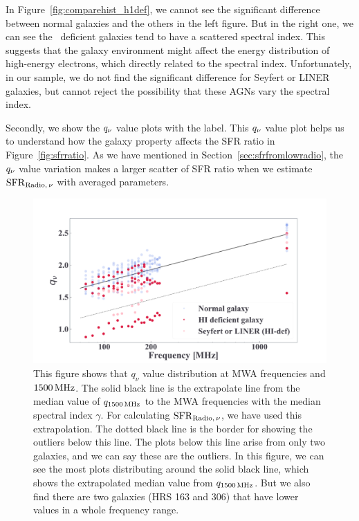 In Figure~\ref{fig:comparehist_h1def}, we cannot see the significant difference between normal galaxies and the others in the left figure.
But in the right one, we can see the \nh~deficient galaxies tend to have a scattered spectral index.
This suggests that the galaxy environment might affect the energy distribution of high-energy electrons, which directly related to the spectral index.
Unfortunately, in our sample, we do not find the significant difference for Seyfert or LINER galaxies, but cannot reject the possibility that these AGNs vary the spectral index.

Secondly, we show the $\qn$ value plots with the label.
This $\qn$ value plot helps us to understand how the galaxy property affects the SFR ratio in Figure~\ref{fig:sfrratio}.
As we have mentioned in Section~\ref{sec:sfrfromlowradio}, the $\qn$ value variation makes a larger scatter of SFR ratio when we estimate $\mathrm{SFR}_{\mathrm{Radio},\,\nu}$ with averaged parameters.

\begin{figure}[htbp]
	\centering
	\includegraphics[width=\linewidth]{Chapter_6/Figures/Discuss_compareq.pdf}
    \caption[$\qn$ plots for each galaxy with labels]{\label{fig:comparehist_q}
        This figure shows that $q_{\nu}$ value distribution at MWA frequencies and $1500\,\mathrm{MHz}$. The solid black line is the extrapolate line from the median value of $q_{\mathrm{1500\,\mathrm{MHz}}}$ to the MWA frequencies with the median spectral index $\gamma$.
        For calculating $\mathrm{SFR}_{\mathrm{Radio},\,\nu}$, we have used this extrapolation. The dotted black line is the border for showing the outliers below this line.
        The plots below this line arise from only two galaxies, and we can say these are the outliers.
        In this figure, we can see the most plots distributing around the solid black line, which shows the extrapolated median value from $q_{\mathrm{1500\,\mathrm{MHz}}}$.
        But we also find there are two galaxies (HRS 163 and 306) that have lower values in a whole frequency range.
    }
\end{figure}

